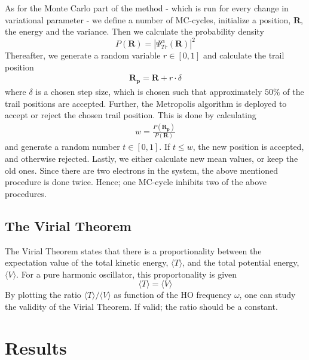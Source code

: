 \documentclass[12pt,english,a4paper]{article}
\begin{document}
As for the Monte Carlo part of the method - which is run for every change in variational parameter - we define a number of MC-cycles, initialize a position, $\boldsymbol{R}$, the energy and the variance. Then we calculate the probability density
\begin{equation}
    P(\boldsymbol{R})=|\Psi_{Tr}^\alpha(\boldsymbol{R})|^2
    \label{eq:probalility_density}
\end{equation}
Thereafter, we generate a random variable $r\in [0,1]$ and calculate the trail position
\begin{align*}
    \boldsymbol{R_p}=\boldsymbol{R}+r\cdot\delta
\end{align*}
where $\delta$ is a chosen step size, which is chosen such that approximately $50\%$ of the trail positions are accepted. Further, the Metropolis algorithm is deployed to accept or reject the chosen trail position. This is done by calculating
\begin{align*}
    w=\frac{P(\boldsymbol{R_p})}{P(\boldsymbol{R})}
\end{align*}
and generate a random number $t\in[0,1]$. If $t\leq w$, the new position is accepted, and otherwise rejected. Lastly, we either calculate new mean values, or keep the old ones. Since there are two electrons in the system, the above mentioned procedure is done twice. Hence; one MC-cycle inhibits two of the above procedures.

\subsection{The Virial Theorem} \label{section:theory:virial}

The Virial Theorem states that there is a proportionality between the expectation value of the total kinetic energy, $\langle T\rangle$, and the total potential energy, $\langle V\rangle$. For a pure harmonic oscillator, this proportonality is given
\begin{equation}
    \langle T\rangle = \langle V\rangle
    \label{virial_theorem}
\end{equation}
By plotting the ratio $\langle T\rangle / \langle V\rangle$ as function of the HO frequency $\omega$, one can study the validity of the Virial Theorem. If valid; the ratio should be a constant.

\section{Results} \label{section:results}
\end{document}
